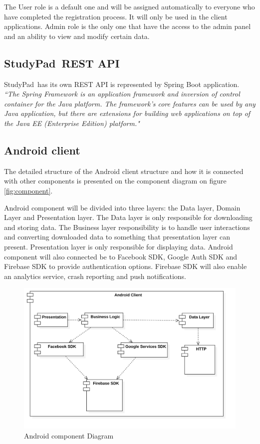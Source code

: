 \documentclass[thesis=B,english]{FITthesis}[2012/10/20]
\newcommand{\appname}{StudyPad}
\newcommand{\quoting}[1]{\textit{``#1"}}
\begin{document}
The User role is a default one and will be assigned automatically to everyone who have completed the registration process. It will only be used in the client applications.
Admin role is the only one that have the access to the admin panel and an ability to view and modify certain data.

\subsection{\appname\ REST API}
\appname\ has its own REST API is represented by Spring Boot application. \cite{studypad-backend} \quoting{The Spring Framework is an application framework and inversion of control container for the Java platform. The framework's core features can be used by any Java application, but there are extensions for building web applications on top of the Java EE (Enterprise Edition) platform.} \cite{wiki-spring}

\subsection{Android client}

The detailed structure of the Android client structure and how it is connected with other components is presented on the component diagram on figure \ref{fig:component}. 

 Android component will be divided into three layers: the Data layer, Domain Layer and Presentation layer. The Data layer is only responsible for downloading and storing data. The Business layer responsibility is to handle user interactions and converting downloaded data to something that presentation layer can present. Presentation layer is only responsible for displaying data. Android component will also connected be to Facebook SDK, Google Auth SDK and Firebase SDK to provide authentication options. Firebase SDK will also enable an analytics service, crash reporting and push notifications.


\begin{figure}[H]
\centering
  \includegraphics[scale=0.25]{androiddiagram}
  \caption{Android component Diagram}
  \label{fig:android-component}
\end{figure}
\end{document}
